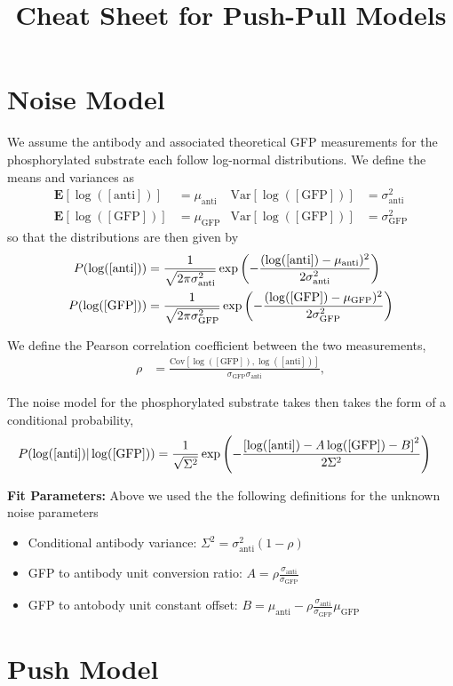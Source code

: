 \documentclass[aps,onecolumn,superscriptaddress,notitlepage]{revtex4-1}
\newcommand{\sigmaGFP}{\sigma_{\mathrm{GFP}}}
\newcommand{\sigmaanti}{\sigma_{\mathrm{anti}}}
\newcommand{\muGFP}{\mu_{\mathrm{GFP}}}
\newcommand{\muanti}{\mu_{\mathrm{anti}}}
\newcommand{\lGFP}{\log([\mathrm{GFP}])}
\newcommand{\lanti}{\log([\mathrm{anti}])}
\newcommand{\E}{\mathbf{E}}
\newcommand{\Var}{\mathrm{Var}}
\newcommand{\Cov}{\mathrm{Cov}}
\begin{document}
\title{Cheat Sheet for Push-Pull Models}
\maketitle

\section{Noise Model}

We assume the antibody and associated theoretical GFP measurements for the phosphorylated substrate each follow log-normal distributions. 
We define the means and variances as
\begin{align}
\E[\lanti] &= \muanti & \Var[\lGFP]&= \sigmaanti^2\\
\E[\lGFP] &= \muGFP & \Var[\lGFP] &= \sigmaGFP^2
\end{align}
so that the distributions are then given by
\begin{align}
P(\lanti) &= \frac{1}{\sqrt{2\pi\sigmaanti^2 }}\exp\qty(-\frac{(\lanti-\muanti)^2}{2\sigmaanti^2})\\
P(\lGFP) &= \frac{1}{\sqrt{2\pi\sigmaGFP^2 }}\exp\qty(-\frac{(\lGFP-\muGFP)^2}{2\sigmaGFP^2})
\end{align}

We define the Pearson correlation coefficient between the two measurements,
\begin{align}
\rho &= \frac{\Cov[\lGFP, \lanti]}{\sigmaGFP\sigmaanti},
\end{align}

The noise model for the phosphorylated substrate takes then takes the form of a conditional probability,
\begin{align}
P(\lanti | \lGFP) &= \frac{1}{\sqrt{\Sigma^2}}\exp\qty(-\frac{\qty[\lanti -A\lGFP - B]^2}{2 \Sigma^2})
\end{align}

\textbf{Fit Parameters:}
Above we used the the following definitions for the unknown noise parameters
\begin{itemize}
\item Conditional antibody variance:  $\Sigma^2 = \sigmaanti^2(1-\rho)$
\item GFP to antibody unit conversion ratio: $A =  \rho \frac{\sigmaanti}{\sigmaGFP}$
\item GFP to antobody unit constant offset: $B = \muanti - \rho \frac{\sigmaanti}{\sigmaGFP}\muGFP$
\end{itemize}


\section{Push Model}
\end{document}
